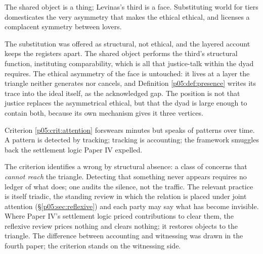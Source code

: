 \begin{objection}
The shared object is a thing; Levinas's third is a face. Substituting world for tiers domesticates the very asymmetry that makes the ethical ethical, and licenses a complacent symmetry between lovers.
\end{objection}
\begin{reply}
The substitution was offered as structural, not ethical, and the layered account keeps the registers apart. The shared object performs the third's structural function, instituting comparability, which is all that justice-talk within the dyad requires. The ethical asymmetry of the face is untouched: it lives at a layer the triangle neither generates nor cancels, and Definition \ref{p05:def:presence} writes its trace into the ideal itself, as the acknowledged gap. The position is not that justice replaces the asymmetrical ethical, but that the dyad is large enough to contain both, because its own mechanism gives it three vertices.
\end{reply}

\begin{objection}
Criterion \ref{p05:crit:attention} forswears minutes but speaks of patterns over time. A pattern is detected by tracking; tracking is accounting; the framework smuggles back the settlement logic Paper IV expelled.
\end{objection}
\begin{reply}
The criterion identifies a wrong by structural absence: a class of concerns that \emph{cannot reach} the triangle. Detecting that something never appears requires no ledger of what does; one audits the silence, not the traffic. The relevant practice is itself triadic, the standing review in which the relation is placed under joint attention (§\ref{p05:sec:reflexive}) and each party may say what has become invisible. Where Paper IV's settlement logic priced contributions to clear them, the reflexive review prices nothing and clears nothing; it restores objects to the triangle. The difference between accounting and witnessing was drawn in the fourth paper; the criterion stands on the witnessing side.
\end{reply}

